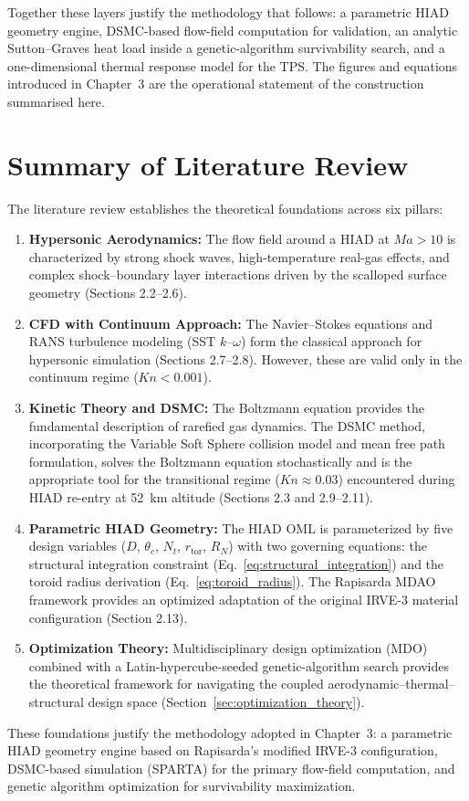 Together these layers justify the methodology that follows: a parametric HIAD geometry engine, DSMC-based flow-field computation for validation, an analytic Sutton--Graves heat load inside a genetic-algorithm survivability search, and a one-dimensional thermal response model for the TPS. The figures and equations introduced in Chapter~3 are the operational statement of the construction summarised here.

\section{Summary of Literature Review}

The literature review establishes the theoretical foundations across six pillars:

\begin{enumerate}
    \item \textbf{Hypersonic Aerodynamics:} The flow field around a HIAD at $Ma > 10$ is characterized by strong shock waves, high-temperature real-gas effects, and complex shock--boundary layer interactions driven by the scalloped surface geometry (Sections 2.2--2.6).

    \item \textbf{CFD with Continuum Approach:} The Navier--Stokes equations and RANS turbulence modeling (SST $k$--$\omega$) form the classical approach for hypersonic simulation (Sections 2.7--2.8). However, these are valid only in the continuum regime ($Kn < 0.001$).

    \item \textbf{Kinetic Theory and DSMC:} The Boltzmann equation provides the fundamental description of rarefied gas dynamics. The DSMC method, incorporating the Variable Soft Sphere collision model and mean free path formulation, solves the Boltzmann equation stochastically and is the appropriate tool for the transitional regime ($Kn \approx 0.03$) encountered during HIAD re-entry at 52~km altitude (Sections 2.3 and 2.9--2.11).

    \item \textbf{Parametric HIAD Geometry:} The HIAD OML is parameterized by five design variables ($D$, $\theta_c$, $N_t$, $r_{\text{tor}}$, $R_N$) with two governing equations: the structural integration constraint (Eq.~\ref{eq:structural_integration}) and the toroid radius derivation (Eq.~\ref{eq:toroid_radius}). The Rapisarda MDAO framework provides an optimized adaptation of the original IRVE-3 material configuration (Section 2.13).

    \item \textbf{Optimization Theory:} Multidisciplinary design optimization (MDO) combined with a Latin-hypercube-seeded genetic-algorithm search provides the theoretical framework for navigating the coupled aerodynamic--thermal--structural design space (Section~\ref{sec:optimization_theory}).
\end{enumerate}

\noindent These foundations justify the methodology adopted in Chapter~3: a parametric HIAD geometry engine based on Rapisarda's modified IRVE-3 configuration, DSMC-based simulation (SPARTA) for the primary flow-field computation, and genetic algorithm optimization for survivability maximization.
